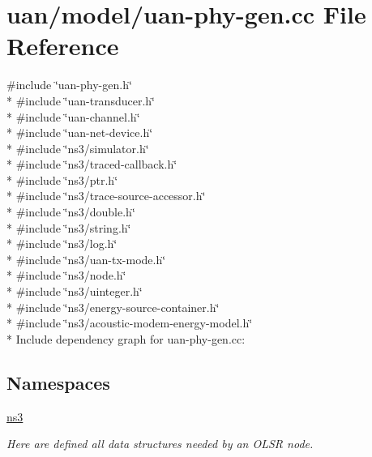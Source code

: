 \hypertarget{uan-phy-gen_8cc}{}\section{uan/model/uan-\/phy-\/gen.cc File Reference}
\label{uan-phy-gen_8cc}
{\ttfamily \#include \char`\"{}uan-\/phy-\/gen.\+h\char`\"{}}\\*
{\ttfamily \#include \char`\"{}uan-\/transducer.\+h\char`\"{}}\\*
{\ttfamily \#include \char`\"{}uan-\/channel.\+h\char`\"{}}\\*
{\ttfamily \#include \char`\"{}uan-\/net-\/device.\+h\char`\"{}}\\*
{\ttfamily \#include \char`\"{}ns3/simulator.\+h\char`\"{}}\\*
{\ttfamily \#include \char`\"{}ns3/traced-\/callback.\+h\char`\"{}}\\*
{\ttfamily \#include \char`\"{}ns3/ptr.\+h\char`\"{}}\\*
{\ttfamily \#include \char`\"{}ns3/trace-\/source-\/accessor.\+h\char`\"{}}\\*
{\ttfamily \#include \char`\"{}ns3/double.\+h\char`\"{}}\\*
{\ttfamily \#include \char`\"{}ns3/string.\+h\char`\"{}}\\*
{\ttfamily \#include \char`\"{}ns3/log.\+h\char`\"{}}\\*
{\ttfamily \#include \char`\"{}ns3/uan-\/tx-\/mode.\+h\char`\"{}}\\*
{\ttfamily \#include \char`\"{}ns3/node.\+h\char`\"{}}\\*
{\ttfamily \#include \char`\"{}ns3/uinteger.\+h\char`\"{}}\\*
{\ttfamily \#include \char`\"{}ns3/energy-\/source-\/container.\+h\char`\"{}}\\*
{\ttfamily \#include \char`\"{}ns3/acoustic-\/modem-\/energy-\/model.\+h\char`\"{}}\\*
Include dependency graph for uan-\/phy-\/gen.cc\+:
\subsection*{Namespaces}
\begin{DoxyCompactItemize}
\item 
 \hyperlink{namespacens3}{ns3}
\begin{DoxyCompactList}\small\item\em Here are defined all data structures needed by an O\+L\+SR node. \end{DoxyCompactList}\end{DoxyCompactItemize}

